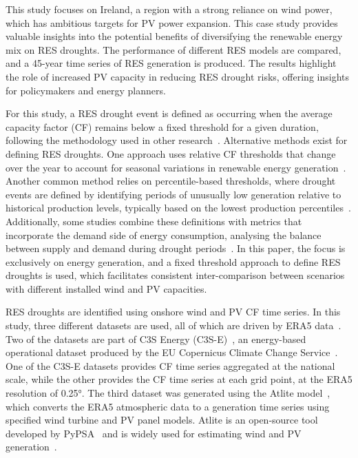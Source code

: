 \documentclass[a4paper, 11p1t]{article}
\begin{document}
This study focuses on Ireland, a region with a strong reliance on wind power, which has ambitious targets for PV power expansion. This case study provides valuable insights into the potential benefits of diversifying the renewable energy mix on RES droughts. The performance of different RES models are compared, and a 45-year time series of RES generation is produced. The results highlight the role of increased PV capacity in reducing RES drought risks, offering insights for policymakers and energy planners.

For this study, a RES drought event is defined as occurring when the average capacity factor (CF) remains below a fixed threshold for a given duration, following the methodology used in other research~\cite{kaspar2019drought, ohba2022drought, mockert2023drought, mayer2023drought}. Alternative methods exist for defining RES droughts. One approach uses relative CF thresholds that change over the year to account for seasonal variations in renewable energy generation~\cite{raynaud2018drought, rinaldi2021drought, gangopadhyay2022drought, allen2023drought, kapica2024drought}. Another common method relies on percentile-based thresholds, where drought events are defined by identifying periods of unusually low generation relative to historical production levels, typically based on the lowest production percentiles~\cite{bracken2024drought, allen2023drought}. Additionally, some studies combine these definitions with metrics that incorporate the demand side of energy consumption, analysing the balance between supply and demand during drought periods~\cite{raynaud2018drought, rinaldi2021drought, allen2023drought, bracken2024drought}. In this paper, the focus is exclusively on energy generation, and a fixed threshold approach to define RES droughts is used, which facilitates consistent inter-comparison between scenarios with different installed wind and PV capacities.

RES droughts are identified using onshore wind and PV CF time series. In this study, three different datasets are used, all of which are driven by ERA5 data~\cite{hersbach2020era5}. Two of the datasets are part of C3S Energy (C3S-E)~\cite{cds2023energy}, an energy-based operational dataset produced by the EU Copernicus Climate Change Service~\cite{dubus2023energy}. One of the C3S-E datasets provides CF time series aggregated at the national scale, while the other provides the CF time series at each grid point, at the ERA5 resolution of 0.25°. The third dataset was generated using the Atlite model~\cite{hofman2021atlite}, which converts the ERA5 atmospheric data to a generation time series using specified wind turbine and PV panel models. Atlite is an open-source tool developed by PyPSA~\cite{hofman2021atlite} and is widely used for estimating wind and PV generation~\cite{mockert2023drought, li2023atlite, parzen2023atlite, ali2023comparative}.
\end{document}
